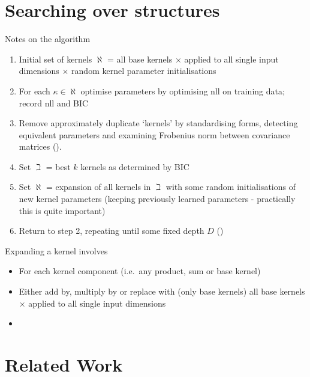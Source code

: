 \documentclass[twoside]{article}
\begin{document}

\section{Searching over structures}


Notes on the algorithm
\begin{enumerate}
\item Initial set of kernels $\aleph$ = all base kernels $\times$ applied to all single input dimensions $\times$ random kernel parameter initialisations
\item For each $\kappa \in \aleph$ optimise parameters by optimising nll on training data; record nll and BIC
\item Remove approximately duplicate `kernels' by standardising forms, detecting equivalent parameters and examining Frobenius norm between covariance matrices ().
\item Set $\beth$ = best $k$ kernels as determined by BIC
\item Set $\aleph$ = expansion of all kernels in $\beth$ with some random initialisations of new kernel parameters (keeping previously learned parameters - practically this is quite important)
\item Return to step 2, repeating until some fixed depth $D$ ()
\end{enumerate}

Expanding a kernel involves
\begin{itemize}
\item For each kernel component (i.e.~any product, sum or base kernel)
\item Either add by, multiply by or replace with (only base kernels) all base kernels $\times$ applied to all single input dimensions
\item {}
\end{itemize}

\section{Related Work}
\end{document}
